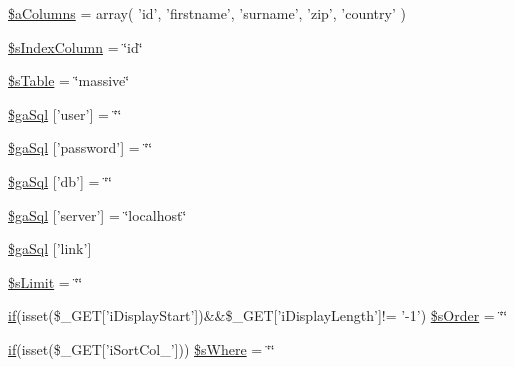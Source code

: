\begin{DoxyCompactItemize}
\item 
\hyperlink{extras_2_scroller_2media_2data_2server__processing_8php_aba12f5ba193beb8beb9fdd0a758711e8}{\$a\+Columns} = array( 'id', 'firstname', 'surname', 'zip', 'country' )
\item 
\hyperlink{extras_2_scroller_2media_2data_2server__processing_8php_a8bddf0b8ded9777b9068de5fa9e217a2}{\$s\+Index\+Column} = \char`\"{}id\char`\"{}
\item 
\hyperlink{extras_2_scroller_2media_2data_2server__processing_8php_a6b7d3b9c752a0c977de5ddae78b522a9}{\$s\+Table} = \char`\"{}massive\char`\"{}
\item 
\hyperlink{extras_2_scroller_2media_2data_2server__processing_8php_a08fc9fba5bf358871d1f80066f8930d1}{\$ga\+Sql} \mbox{[}'user'\mbox{]} = \char`\"{}\char`\"{}
\item 
\hyperlink{extras_2_scroller_2media_2data_2server__processing_8php_a5a7f7a53d25bfc58a76a0132750c80eb}{\$ga\+Sql} \mbox{[}'password'\mbox{]} = \char`\"{}\char`\"{}
\item 
\hyperlink{extras_2_scroller_2media_2data_2server__processing_8php_aaa5ffcba6d18eacf65c42024605b6486}{\$ga\+Sql} \mbox{[}'db'\mbox{]} = \char`\"{}\char`\"{}
\item 
\hyperlink{extras_2_scroller_2media_2data_2server__processing_8php_a23a651ce4e9cd3741cb88709c0bfdf8e}{\$ga\+Sql} \mbox{[}'server'\mbox{]} = \char`\"{}localhost\char`\"{}
\item 
\hyperlink{extras_2_scroller_2media_2data_2server__processing_8php_a57b1f46c51a5dafdbde39b16259c7e77}{\$ga\+Sql} \mbox{[}'link'\mbox{]}
\item 
\hyperlink{extras_2_scroller_2media_2data_2server__processing_8php_a21edf730f95a442beb3e90314d1f0946}{\$s\+Limit} = \char`\"{}\char`\"{}
\item 
\hyperlink{fullpage_2plugin_8js_a8b98017e64ef036adb9ae327ff94abe1}{if}(isset(\$\+\_\+\+G\+E\+T\mbox{[}'i\+Display\+Start'\mbox{]})\&\&\$\+\_\+\+G\+E\+T\mbox{[}'i\+Display\+Length'\mbox{]}!= '-\/1') \hyperlink{extras_2_scroller_2media_2data_2server__processing_8php_a4943002271f61f76fd87176bc8b923bf}{\$s\+Order} = \char`\"{}\char`\"{}
\item 
\hyperlink{fullpage_2plugin_8js_a8b98017e64ef036adb9ae327ff94abe1}{if}(isset(\$\+\_\+\+G\+E\+T\mbox{[}'i\+Sort\+Col\+\_'\mbox{]})) \hyperlink{extras_2_scroller_2media_2data_2server__processing_8php_a377c76acb9c99eb7153f952d3e677c2b}{\$s\+Where} = \char`\"{}\char`\"{}
\item 

\end{DoxyCompactItemize}
